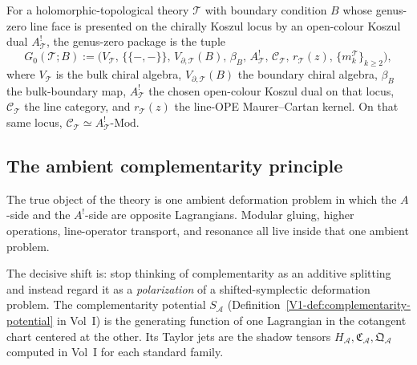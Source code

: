 \begin{definition}
For a holomorphic-topological theory $\mathcal{T}$ with boundary
condition $B$ whose genus-zero line face is presented on the
chirally Koszul locus by an open-colour Koszul dual
$A^!_{\mathcal{T}}$, the genus-zero package is the tuple
\begin{equation}
G_0(\mathcal{T}; B)
:=
\bigl(
V_{\mathcal{T}},\,
\{\!\{-,-\}\!\},\,
V_{\partial,\mathcal{T}}(B),\,
\beta_B,\,
A^!_{\mathcal{T}},\,
\mathcal{C}_{\mathcal{T}},\,
r_{\mathcal{T}}(z),\,
\{m_k^{\mathcal{T}}\}_{k \geq 2}
\bigr),
\end{equation}
where $V_{\mathcal{T}}$ is the bulk chiral algebra,
$V_{\partial,\mathcal{T}}(B)$ the boundary chiral algebra,
$\beta_B$ the bulk-boundary map, $A^!_{\mathcal{T}}$ the chosen
open-colour Koszul dual on that locus,
$\mathcal{C}_{\mathcal{T}}$ the line category, and
$r_{\mathcal{T}}(z)$ the line-OPE Maurer--Cartan kernel. On that
same locus,
$\mathcal{C}_{\mathcal{T}} \simeq A^!_{\mathcal{T}}\text{-Mod}$.
\end{definition}

\subsection{The ambient complementarity principle}

\begin{principle}
The true object of the theory is one ambient deformation problem in
which the $A$-side and the $A^!$-side are opposite Lagrangians.
Modular gluing, higher operations, line-operator transport, and
resonance all live inside that one ambient problem.
\end{principle}

The decisive shift is: stop thinking of complementarity as an
additive splitting and instead regard it as a \emph{polarization}
of a shifted-symplectic deformation problem. The complementarity
potential $S_{\mathcal{A}}$
(Definition~\ref*{V1-def:complementarity-potential} in Vol~I) is the
generating function of one Lagrangian in the cotangent chart
centered at the other. Its Taylor jets are the shadow tensors
$H_{\mathcal{A}}, \mathfrak{C}_{\mathcal{A}},
\mathfrak{Q}_{\mathcal{A}}$ computed in
Vol~I for each standard family.

